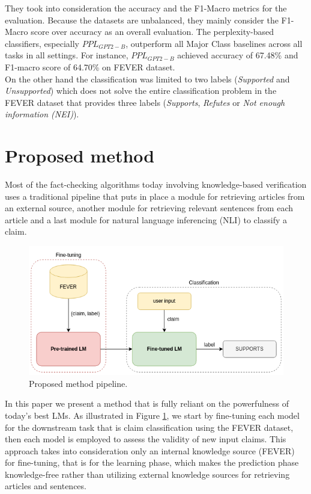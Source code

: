 \documentclass[conference]{IEEEtran}
\begin{document}
They took into consideration the accuracy and the F1-Macro metrics for the evaluation. Because the datasets are unbalanced, they mainly consider the F1-Macro score over accuracy as an overall evaluation. The perplexity-based classifiers, especially $PPL_{GPT2-B}$, outperform all Major Class baselines across all
tasks in all settings. For instance, $PPL_{GPT2-B}$ achieved accuracy of 67.48\% and F1-macro score of 64.70\% on FEVER dataset.\\
On the other hand the classification was limited to two labels (\emph{Supported} and \emph{Unsupported}) which does not solve the entire classification problem in the FEVER dataset that provides three labels (\textit{Supports}, \textit{Refutes} or \textit{Not enough information (NEI)}).

\section{Proposed method}
Most of the fact-checking algorithms today involving knowledge-based verification uses a traditional pipeline that puts in place a module for retrieving articles from an external source, another module for retrieving relevant sentences from each article and a last module for natural language inferencing (NLI) to classify a claim.

\begin{figure}[htp]
    \centering
    \includegraphics[scale=0.4]{processing_pipeline.png}
    \caption{Proposed method pipeline.}
    \label{fig:processing_pipeline}
\end{figure}


In this paper we present a method that is fully reliant on the powerfulness of today's best LMs. As illustrated in Figure \ref{fig:processing_pipeline}, we start by fine-tuning each model for the downstream task that is claim classification using the FEVER dataset, then each model is employed to assess the validity of new input claims. This approach takes into consideration only an internal knowledge source (FEVER) for fine-tuning, that is for the learning phase, which makes the prediction phase knowledge-free rather than utilizing external knowledge sources for retrieving articles and sentences.
\end{document}
